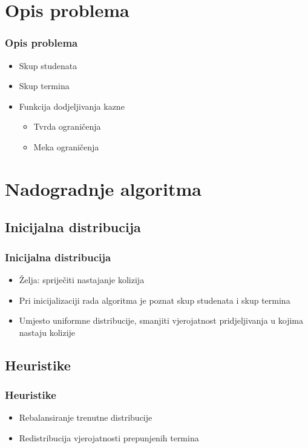 \documentclass{beamer}
\begin{document}




\section{Opis problema}
\begin{frame}
\frametitle{Opis problema}
\begin{itemize}
  \item Skup studenata
  \item Skup termina
  \item Funkcija dodjeljivanja kazne
  \begin{itemize}
    \item Tvrda ograničenja
    \item Meka ograničenja
  \end{itemize}
\end{itemize}
\end{frame}

\section{Nadogradnje algoritma}

\subsection{Inicijalna distribucija}
\begin{frame}
\frametitle{Inicijalna distribucija}
\begin{itemize}
  \item Želja: spriječiti nastajanje kolizija
  \item Pri inicijalizaciji rada algoritma je poznat skup studenata i skup termina
  \item Umjesto uniformne distribucije, smanjiti vjerojatnost pridjeljivanja u kojima nastaju kolizije
\end{itemize}
\end{frame}

\subsection{Heuristike}
\begin{frame}
\frametitle{Heuristike}
\begin{itemize}
  \item Rebalansiranje trenutne distribucije
  \item Redistribucija vjerojatnosti prepunjenih termina
\end{itemize}
\end{frame}
\end{document}
